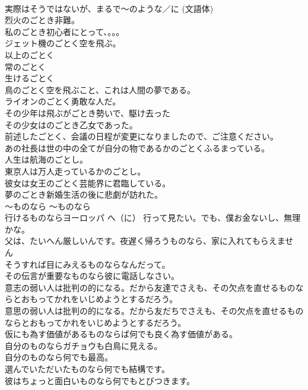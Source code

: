 \documentclass[8pt]{extreport}
\begin{document}
\begin{CJK}{UTF8}{min}
\\	実際はそうではないが、まるで〜のような／に (文語体)	
\\	烈火のごとき非難。  
\\	私のごとき初心者にとって、。。。  
\\	ジェット機のごとく空を飛ぶ。  
\\	以上のごとく  
\\	常のごとく  
\\	生けるごとく  
\\	鳥のごとく空を飛ぶこと、これは人間の夢である。  
\\	ライオンのごとく勇敢な人だ。  
\\	その少年は飛ぶがごとき勢いで、駆け去った  
\\	その少女はのごとき乙女であった。  
\\	前述したごとく、会議の日程が変更になりましたので、ご注意ください。  
\\	あの社長は世の中の全てが自分の物であるかのごとくふるまっている。  
\\	人生は航海のごとし。  
\\	東京人は万人走っているかのごとし。  
\\	彼女は女王のごとく芸能界に君臨している。  
\\	夢のごとき新婚生活の後に悲劇が訪れた。  
\\	〜ものなら	〜ものなら	
\\	行けるものならヨーロッパ へ（に） 行って見たい。でも、僕お金ないし、無理かな。  
\\	父は、たいへん厳しいんです。夜遅く帰ろうものなら、家に入れてもらえません  
\\	そうすれば目にみえるものならなんだって。   
\\	その伝言が重要なものなら彼に電話しなさい。   
\\	意志の弱い人は批判の的になる。だから友達でさえも、その欠点を直せるものならとおもってかれをいじめようとするだろう。   
\\	意思の弱い人は批判の的になる。だから友だちでさえも、その欠点を直せるものならとおもってかれをいじめようとするだろう。   
\\	仮にも為す価値があるものならば何でも良く為す価値がある。   
\\	自分のものならガチョウも白鳥に見える。   
\\	自分のものなら何でも最高。   
\\	選んでいただいたものなら何でも結構です。  
\\	彼はちょっと面白いものなら何でもとびつきます。   

\end{CJK}
\end{document}
